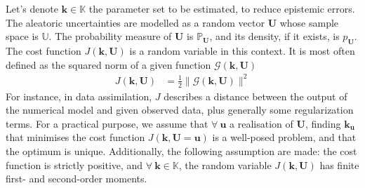 \documentclass[preprint, 1p]{elsarticle}
\DeclareMathOperator*{\argmin}{arg\,min \,}
\newcommand{\Prob}{\mathbb{P}}
\newcommand{\kest}{\hat{\mathbf{k}}}
\newcommand{\Kspace}{\mathbb{K}}
\newcommand{\Uspace}{\mathbb{U}}
\newcommand{\elise}[1]{{\itshape\color{red} ({#1})}}
\newcommand{\victor}[1]{{\itshape\color{green} ({#1})}}
\begin{document}
Let's denote $\mathbf{k} \in \Kspace$ the parameter set to be estimated, to reduce epistemic errors. The aleatoric uncertainties are modelled as a random vector $\mathbf{U}$ whose sample space is $\Uspace$. The probability measure of $\mathbf{U}$ is $\Prob_{\mathbf{U}}$, and its density, if it exists, is $p_{\mathbf{U}}$. %
%
The cost function $J(\mathbf{k}, \mathbf{U})$ is a random variable in this context. %
It is most often defined as the squared norm of a given function $\mathcal{G}(\mathbf{k}, \mathbf{U})$%
\begin{align}
  \label{eq:def_cost_fun}
  J(\mathbf{k},\mathbf{U}) & = \frac12\|\mathcal{G}(\mathbf{k}, \mathbf{U})\|^2
  \end{align}
For instance, in data assimilation, $J$ describes a distance between the output of the numerical model and given observed data, plus generally some regularization terms.
%
%
For a practical purpose, we assume that $\forall~ \mathbf{u}$ a realisation of $\mathbf{U}$, finding ${\mathbf{k}}_{\mathbf{u}}$ that minimises the cost function $J(\mathbf{k}, \mathbf{U}=\mathbf{u})$ is a well-posed problem, and that the optimum is unique.
Additionally, the following assumption are made: the cost function is strictly positive, and $\forall~  \mathbf{k} \in \Kspace$, the random variable $J(\mathbf{k},\mathbf{U})$ has finite first- and second-order moments. 
 
\end{document}
